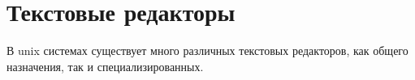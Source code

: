 \section{Текстовые редакторы}
В unix системах существует много различных текстовых редакторов, как общего назначения, так и специализированных.
